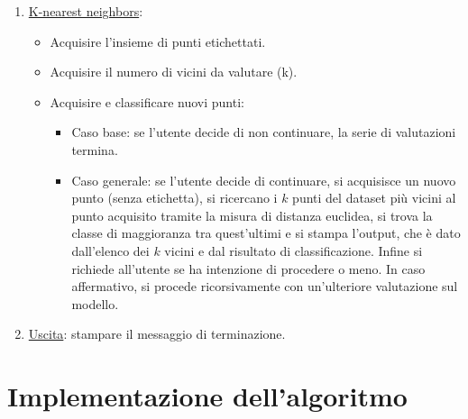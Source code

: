 \documentclass[11pt]{article}
\theoremstyle{definition}
\begin{document}
\begin{itemize}
\begin{enumerate}
     \item \underline{K-nearest neighbors}: 
       \begin{itemize}
         \item Acquisire l'insieme di punti etichettati.
         \item Acquisire il numero di vicini da valutare (k).
         \item Acquisire e classificare nuovi punti:
         \begin{itemize}
           \item Caso base: se l'utente decide di non continuare, la serie di valutazioni termina.
           \item Caso generale: se l'utente decide di continuare, si acquisisce un nuovo punto (senza etichetta), si ricercano i $k$ punti del dataset più vicini al punto acquisito tramite la misura di distanza euclidea, si trova la classe di maggioranza tra quest'ultimi e si stampa l'output, che è dato dall'elenco dei $k$ vicini e dal risultato di classificazione. Infine si richiede all'utente se ha intenzione di procedere o meno. In caso affermativo, si procede ricorsivamente con un'ulteriore valutazione sul modello.
         \end{itemize}
       \end{itemize}
      \item \underline{Uscita}: stampare il messaggio di terminazione.
\end{enumerate}
\end{itemize}

\newpage

\section{Implementazione dell'algoritmo}
\end{document}
